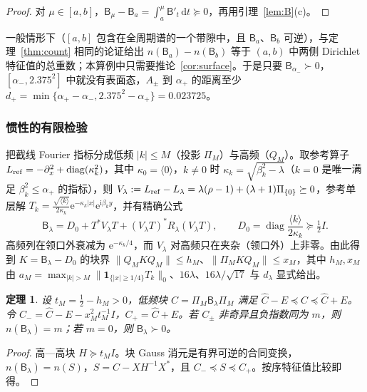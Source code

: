 \documentclass[11pt,a4paper,fontset=fandol]{ctexart}
\newcommand{\ii}{\mathrm{i}}
\newcommand{\ee}{\mathrm{e}}
\newcommand{\dd}{\mathrm{d}}
\theoremstyle{plain}
\newtheorem{theorem}{定理}[section]
\theoremstyle{definition}
\theoremstyle{remark}
\begin{document}
\begin{proof}
对 $\mu\in[a,b]$，$\mathsf B_\mu-\mathsf B_a=\int_a^\mu\mathsf B'_t\,\dd t\succeq0$，再用引理~\ref{lem:B}(c)。
\end{proof}

一般情形下（$[a,b]$ 包含在全周期谱的一个带隙中，且 $\mathsf B_a$、$\mathsf B_b$ 可逆），与定理~\ref{thm:count} 相同的论证给出 $n(\mathsf B_a)-n(\mathsf B_b)$ 等于 $(a,b)$ 中两侧 Dirichlet 特征值的总重数；本算例中只需要推论~\ref{cor:surface}。于是只要 $\mathsf B_{\alpha_-}\succ0$，$[\alpha_-,2.375^2]$ 中就没有表面态，$A_\pm$ 到 $\alpha_+$ 的距离至少 $d_+=\min\{\alpha_+-\alpha_-,2.375^2-\alpha_+\}=0.023725$。

\subsubsection{惯性的有限检验}

把截线 Fourier 指标分成低频 $|k|\le M$（投影 $\Pi_M$）与高频（$Q_M$）。取参考算子 $L_{\rm ref}=-\partial_x^2+\operatorname{diag}(\kappa_k^2)$，其中 $\kappa_0=\langle0\rangle$，$k\ne0$ 时 $\kappa_k=\sqrt{\beta_k^2-\lambda}$（$k=0$ 是唯一满足 $\beta_k^2\le\alpha_+$ 的指标），则 $V_\lambda:=L_{\rm ref}-L_\lambda=\lambda(\rho-1)+(\lambda+1)\Pi_{\{0\}}\succeq0$，参考单层解 $T_k=\frac{\sqrt{\langle k\rangle}}{2\kappa_k}\ee^{-\kappa_k|x|}\ee^{\ii\beta_ky}$，并有精确公式
\begin{equation}
\label{eq:B-exact}
\mathsf B_\lambda=D_0+T^*V_\lambda T+(V_\lambda T)^*R_\lambda(V_\lambda T),\qquad D_0=\operatorname{diag}\frac{\langle k\rangle}{2\kappa_k}\succeq\tfrac12I .
\end{equation}
高频列在领口外衰减为 $\ee^{-\kappa_k/4}$，而 $V_\lambda$ 对高频只在夹杂（领口外）上非零。由此得到 $K=\mathsf B_\lambda-D_0$ 的块界 $\|Q_MKQ_M\|\le h_M$、$\|\Pi_MKQ_M\|\le x_M$，其中 $h_M,x_M$ 由 $a_M=\max_{|k|>M}\|\mathbf 1_{\{|x|\ge1/4\}}T_k\|_0$、$16\lambda$、$16\lambda/\sqrt{17}$ 与 $d_\lambda$ 显式给出。

\begin{theorem}
\label{thm:B-schur}
设 $t_M=\frac12-h_M>0$，低频块 $C=\Pi_M\mathsf B_\lambda\Pi_M$ 满足 $\hat C-E\preceq C\preceq\hat C+E$。令 $C_-=\hat C-E-x_M^2t_M^{-1}I$，$C_+=\hat C+E$。若 $C_\pm$ 非奇异且负指数同为 $m$，则 $n(\mathsf B_\lambda)=m$；若 $m=0$，则 $\mathsf B_\lambda\succ0$。
\end{theorem}

\begin{proof}
高—高块 $H\succeq t_MI$。块 Gauss 消元是有界可逆的合同变换，$n(\mathsf B_\lambda)=n(S)$，$S=C-XH^{-1}X^*$，且 $C_-\preceq S\preceq C_+$。按序特征值比较即得。
\end{proof}
\end{document}
